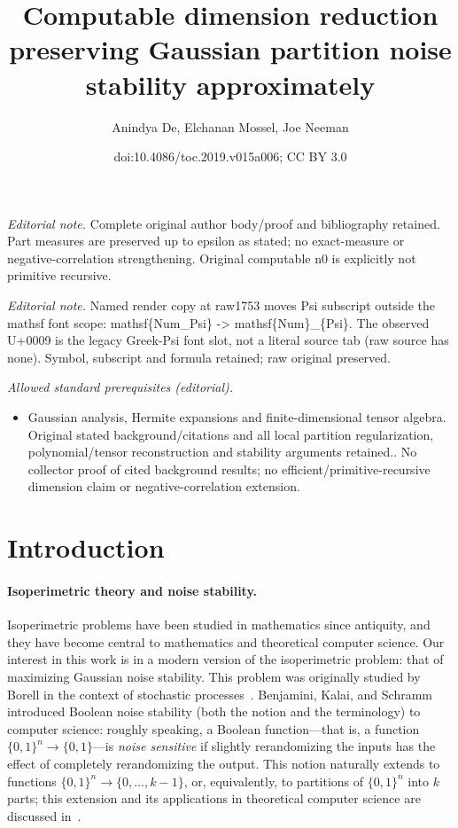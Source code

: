 \documentclass[11pt]{article}
\title{Computable dimension reduction preserving Gaussian partition noise stability approximately}
\author{Anindya De, Elchanan Mossel, Joe Neeman}
\date{doi:10.4086/toc.2019.v015a006; CC BY 3.0}
\numberwithin{equation}{section}
\theoremstyle{definition}
\theoremstyle{plain}
\begin{document}
\maketitle
\noindent\textit{Editorial note.} Complete original author body/proof and bibliography retained. Part measures are preserved up to epsilon as stated; no exact-measure or negative-correlation strengthening. Original computable n0 is explicitly not primitive recursive.\par\medskip
\noindent\textit{Editorial note.} Named render copy at raw1753 moves Psi subscript outside the mathsf font scope: mathsf\{Num\_Psi\} -> mathsf\{Num\}\_\{Psi\}. The observed U+0009 is the legacy Greek-Psi font slot, not a literal source tab (raw source has none). Symbol, subscript and formula retained; raw original preserved.\par\medskip
\noindent\textit{Allowed standard prerequisites (editorial).}\begin{itemize}
\item Gaussian analysis, Hermite expansions and finite-dimensional tensor algebra. Original stated background/citations and all local partition regularization, polynomial/tensor reconstruction and stability arguments retained.. No collector proof of cited background results; no efficient/primitive-recursive dimension claim or negative-correlation extension.
\end{itemize}\medskip
\section{Introduction} 

\paragraph{Isoperimetric theory and noise stability.}
Isoperimetric problems have been studied in mathematics since antiquity, and
they have become central to  mathematics and theoretical computer
science.
Our interest in this work is in a modern version of the isoperimetric problem: that of
maximizing Gaussian noise stability. This problem was originally studied by Borell in
the context of stochastic processes~\cite{Borell:85}.
Benjamini, Kalai, and Schramm~\cite{BKS:99} introduced Boolean noise stability
(both the notion and the terminology) to computer science: roughly speaking, a
Boolean function---that is, a function $\{0, 1\}^n \to \{0, 1\}$---is
\emph{noise sensitive} if slightly rerandomizing the inputs has the effect of
completely rerandomizing the output. This notion naturally extends to functions
$\{0, 1\}^n \to \{0, \dots, k - 1\}$, or, equivalently, to partitions of $\{0,
1\}^n$ into $k$ parts; this extension and its applications in theoretical computer
science
%
are   %
discussed in~\cite{IsakssonMossel:12}.
\end{document}
